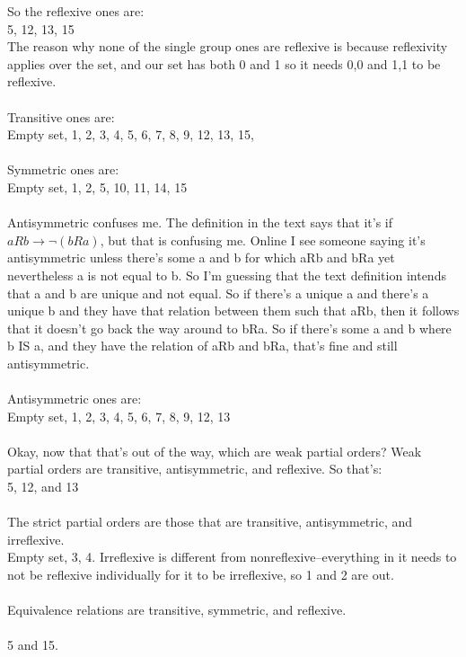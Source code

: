 \documentclass{article}
\begin{document}
So the reflexive ones are: \\
5, 12, 13, 15
\\ The reason why none of the single group ones are reflexive is because reflexivity applies over the set, and our set has both 0 and 1 so it needs 0,0 and 1,1 to be reflexive. 
\\\\
Transitive ones are:\\
Empty set, 1, 2, 3, 4, 5, 6, 7, 8, 9, 12, 13, 15, 
\\\\
Symmetric ones are:\\
Empty set, 1, 2, 5, 10, 11, 14, 15
\\\\
Antisymmetric confuses me. The definition in the text says that it's if $aRb \rightarrow \neg (bRa)$, but that is confusing me. Online I see someone saying it's antisymmetric unless there's some a and b for which aRb and bRa yet nevertheless a is not equal to b. So I'm guessing that the text definition intends that a and b are unique and not equal. So if there's a unique a and there's a unique b and they have that relation between them such that aRb, then it follows that it doesn't go back the way around to bRa. So if there's some a and b where b IS a, and they have the relation of aRb and bRa, that's fine and still antisymmetric. 
\\
\\
Antisymmetric ones are: \\
Empty set, 1, 2, 3, 4, 5, 6, 7, 8, 9, 12, 13
\\\\
Okay, now that that's out of the way, which are weak partial orders? Weak partial orders are transitive, antisymmetric, and reflexive. So that's: \\
5, 12, and 13
\\\\
The strict partial orders are those that are transitive, antisymmetric, and irreflexive. \\
Empty set, 3, 4. Irreflexive is different from nonreflexive--everything in it needs to not be reflexive individually for it to be irreflexive, so 1 and 2 are out.
\\\\
Equivalence relations are transitive, symmetric, and reflexive. \\\\
5 and 15.
\end{document}
